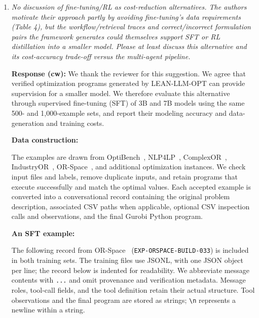 \documentclass[11pt]{article}
\newcommand{\edit}[1]{{\color{hopkins-blue}\itshape #1}}
\begin{document}
\begin{enumerate}[label=(R2.Major.\arabic*),leftmargin=*]
The revised manuscript includes these end-to-end comparisons in the main
experimental section. The appendix reports the detailed input, output, cached,
and reasoning-token breakdowns; stage-level LLM, retrieval, and data-tool
calls; latency, retries, failure counts, and per-run API costs. The
experimental configuration and API price schedule are also provided to make
the comparison reproducible.

\item \edit{No discussion of fine-tuning/RL as cost-reduction alternatives. The authors motivate their approach partly by avoiding fine-tuning's data requirements (Table 4), but the workflow/retrieval traces and correct/incorrect formulation pairs the framework generates could themselves support SFT or RL distillation into a smaller model. Please at least discuss this alternative and its cost-accuracy trade-off versus the multi-agent pipeline.}\label{R2-major-4}

\textbf{Response (cw):}
We thank the reviewer for this suggestion. We agree that verified optimization programs generated by LEAN-LLM-OPT can provide supervision for a smaller model. We therefore evaluate this alternative through supervised fine-tuning (SFT) of 3B and 7B models using the same 500- and 1,000-example sets, and report their modeling accuracy and data-generation and training costs.\par\medskip
\noindent\textbf{Data construction:}

The examples are drawn from OptiBench~\citep{yang2025optibench}, NLP4LP~\citep{ahmaditeshnizi2024optimus03}, ComplexOR~\citep{xiao2024chainofexperts}, IndustryOR~\citep{huang2025orlm}, OR-Space~\citep{zhou2026orspace}, and additional optimization instances. We check input files and labels, remove duplicate inputs, and retain programs that execute successfully and match the optimal values. Each accepted example is converted into a conversational record containing the original problem description, associated CSV paths when applicable, optional CSV inspection calls and observations, and the final Gurobi Python program.

\medskip
\textbf{An SFT example:}

The following record from OR-Space~\citep{zhou2026orspace} (\texttt{EXP-ORSPACE-BUILD-033}) is included in both training sets. The training files use JSONL, with one JSON object per line; the record below is indented for readability. We abbreviate message contents with \texttt{...} and omit provenance and verification metadata. Message roles, tool-call fields, and the tool definition retain their actual structure. Tool observations and the final program are stored as strings; \texttt{\textbackslash n} represents a newline within a string.


\end{enumerate}
\end{document}
